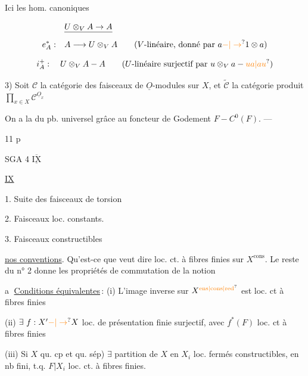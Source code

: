 Ici les hom. canoniques 

\[
\begin{aligned}
&\deleted{U\otimes_V A\to A}\\
e_A^*:\quad & A\longrightarrow U\otimes_V A \qquad (V\text{-linéaire, donné par }a\unsure{-|\to}1\otimes a)
\end{aligned}
\]

\[
i_A^{+}:\quad U\otimes_V A-A \qquad (U\text{-linéaire surjectif par }u\otimes_V a-\unsure{ua|au})
\]

3) Soit $\mathcal C$ la catégorie des faisceaux de $\underline O$-modules sur $X$, et $\widetilde{\mathcal C}$ la catégorie produit $\prod_{x\in X}\mathcal C^{\underline O_x}$

On a la  du pb. universel grâce au foncteur de Godement $F-C^0(F)$. \quad ---

\uline{}

11 p

SGA 4 $\underline{\overline{\mathrm{IX}}}$



 \uline{IX}

1. Suite des faisceaux de torsion

2. Faisceaux loc. constants.

3. Faisceaux constructibles

\uline{ nos conventions}. Qu'est-ce que veut dire loc. ct. à fibres finies sur $X^{\mathrm{cons}}$. Le reste du n° 2 donne les propriétés de commutation de la notion

\textcircled{a} \uline{Conditions équivalentes}\,: (i) L'image inverse sur $X^{\unsure{\mathrm{ens}|\mathrm{cons}|\mathrm{red}}}$ est loc. ct à fibres finies

(ii) $\exists\ f:X'\unsure{-|\to}X$ loc. de présentation finie surjectif, avec $f^*(F)$ loc. ct à fibres finies

(iii)  Si $X$ qu. cp et qu. sép) $\exists$ partition de $X$ en $X_i$ loc. fermés constructibles, en nb fini, t.q. $F|X_i$ loc. ct. à fibres finies.

